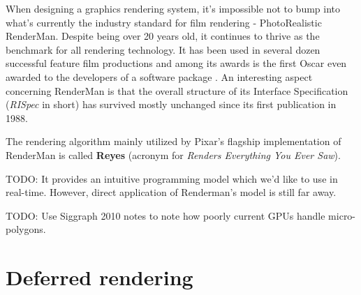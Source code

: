 
When designing a graphics rendering system, it's impossible not to bump into what's currently the industry standard for film rendering - PhotoRealistic RenderMan. Despite being over 20 years old, it continues to thrive as the benchmark for all rendering technology. It has been used in several dozen successful feature film productions and among its awards is the first Oscar even awarded to the developers of a software package \cite{RenderManAwards}. An interesting aspect concerning RenderMan is that the overall structure of its Interface Specification (\emph{RISpec} in short) has survived mostly unchanged since its first publication in 1988.

The rendering algorithm mainly utilized by Pixar's flagship implementation of RenderMan is called \textbf{Reyes} (acronym for \emph{Renders Everything You Ever Saw}).

TODO: It provides an intuitive programming model which we'd like to use in real-time. However, direct application of Renderman's model is still far away.

TODO: Use Siggraph 2010 notes to note how poorly current GPUs handle micro-polygons.

\section{Deferred rendering}

